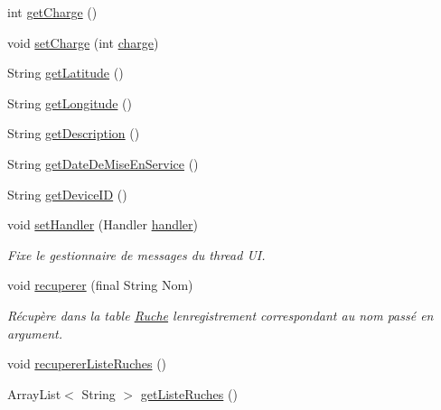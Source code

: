 \begin{DoxyCompactItemize}
\item 
int \hyperlink{classfr_1_1campus_1_1laurainc_1_1honeybee_1_1_ruche_a28fe3a64c8aaf28cf15a96a8aa37e23b}{get\+Charge} ()
\item 
void \hyperlink{classfr_1_1campus_1_1laurainc_1_1honeybee_1_1_ruche_a02299f4e79c0396df8e2fe000628b5cc}{set\+Charge} (int \hyperlink{classfr_1_1campus_1_1laurainc_1_1honeybee_1_1_ruche_adf68ff1828b2eaa02c8411a9c5727bf9}{charge})
\item 
String \hyperlink{classfr_1_1campus_1_1laurainc_1_1honeybee_1_1_ruche_a3f03f6958a9251f72e60e45a6b8eb65c}{get\+Latitude} ()
\item 
String \hyperlink{classfr_1_1campus_1_1laurainc_1_1honeybee_1_1_ruche_a45b3656e287e168f17fdd1b9ec5fbca1}{get\+Longitude} ()
\item 
String \hyperlink{classfr_1_1campus_1_1laurainc_1_1honeybee_1_1_ruche_ade21eb84d2a34d71cc2e89134b79cfd2}{get\+Description} ()
\item 
String \hyperlink{classfr_1_1campus_1_1laurainc_1_1honeybee_1_1_ruche_a91d42ceda1aed3eb0eb39c013f62a149}{get\+Date\+De\+Mise\+En\+Service} ()
\item 
String \hyperlink{classfr_1_1campus_1_1laurainc_1_1honeybee_1_1_ruche_a0cbf5aacc51f6a0fc5bd9def0f1a32c7}{get\+Device\+ID} ()
\item 
void \hyperlink{classfr_1_1campus_1_1laurainc_1_1honeybee_1_1_ruche_acac6e35c9bc030a5cf608b245703d32e}{set\+Handler} (Handler \hyperlink{classfr_1_1campus_1_1laurainc_1_1honeybee_1_1_ruche_a9689ca454694434549e5fffca876ffae}{handler})
\begin{DoxyCompactList}\small\item\em Fixe le gestionnaire de messages du thread UI. \end{DoxyCompactList}\item 
void \hyperlink{classfr_1_1campus_1_1laurainc_1_1honeybee_1_1_ruche_a7a99d3c585f2c507eb2c6c265a5bb1fe}{recuperer} (final String Nom)
\begin{DoxyCompactList}\small\item\em Récupère dans la table \hyperlink{classfr_1_1campus_1_1laurainc_1_1honeybee_1_1_ruche}{Ruche} l\textquotesingle{}enregistrement correspondant au nom passé en argument. \end{DoxyCompactList}\item 
void \hyperlink{classfr_1_1campus_1_1laurainc_1_1honeybee_1_1_ruche_aba0591cda391b907da41a0afeba4d59d}{recuperer\+Liste\+Ruches} ()
\item 
Array\+List$<$ String $>$ \hyperlink{classfr_1_1campus_1_1laurainc_1_1honeybee_1_1_ruche_a7108fb412c0628d3966aa8c76fd9e2b7}{get\+Liste\+Ruches} ()

\end{DoxyCompactItemize}
